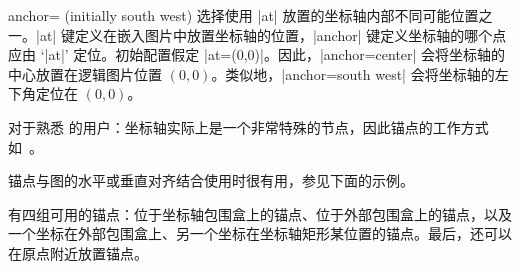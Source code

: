 \begin{pgfplotskey}{anchor= (initially south west)}
\label{option:anchor}
    选择使用 |at| 放置的坐标轴内部不同可能位置之一。|at| 键定义在嵌入图片中放置坐标轴的位置，|anchor| 键定义坐标轴的哪个点应由 `|at|' 定位。初始配置假定 |at={(0,0)}|。因此，|anchor=center| 会将坐标轴的中心放置在逻辑图片位置 $(0,0)$。类似地，|anchor=south west| 会将坐标轴的左下角定位在 $(0,0)$。

    对于熟悉 \Tikz{} 的用户：坐标轴实际上是一个非常特殊的节点，因此锚点的工作方式如~\cite{tikz}。

    锚点与图的水平或垂直对齐结合使用时很有用，参见下面的示例。

    有四组可用的锚点：位于坐标轴包围盒上的锚点、位于外部包围盒上的锚点，以及一个坐标在外部包围盒上、另一个坐标在坐标轴矩形某位置的锚点。最后，还可以在原点附近放置锚点。


\end{pgfplotskey}
